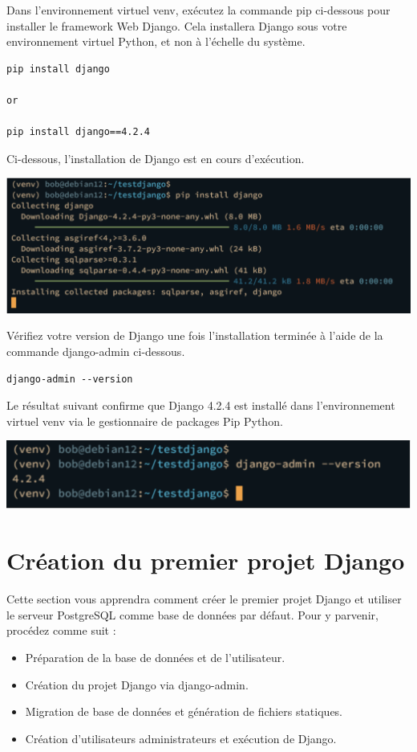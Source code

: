 \documentclass{article}
\begin{document}
Dans l'environnement virtuel venv, exécutez la commande pip ci-dessous pour installer le framework Web Django. Cela installera Django sous votre environnement virtuel Python, et non à l'échelle du système.

\begin{verbatim}
pip install django

or

pip install django==4.2.4
\end{verbatim}

Ci-dessous, l'installation de Django est en cours d'exécution.

\begin{center}
\includegraphics[width=15cm]{images/image06.png}
\end{center}

Vérifiez votre version de Django une fois l'installation terminée à l'aide de la commande django-admin ci-dessous.

\begin{verbatim}
django-admin --version
\end{verbatim}

Le résultat suivant confirme que Django 4.2.4 est installé dans l'environnement virtuel venv via le gestionnaire de packages Pip Python.
\begin{center}
\includegraphics[width=15cm]{images/image07.png}
\end{center}
\section{Création du premier projet Django}
Cette section vous apprendra comment créer le premier projet Django et utiliser le serveur PostgreSQL comme base de données par défaut. Pour y parvenir, procédez comme suit :
\begin{itemize}
\item Préparation de la base de données et de l'utilisateur.
\item Création du projet Django via django-admin.
\item Migration de base de données et génération de fichiers statiques.
\item Création d'utilisateurs administrateurs et exécution de Django.
\end{itemize}
\end{document}
